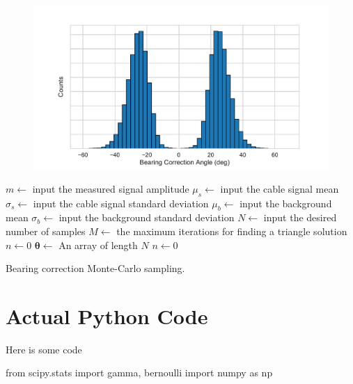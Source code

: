 \documentclass[paper=a4, fontsize=11pt]{scrartcl}
\numberwithin{equation}{section}		%
\numberwithin{figure}{section}			%
\numberwithin{table}{section}				%
\begin{document}
\begin{appendices}
\begin{figure}
  
  \label{fig:correction_hist}
  \centering
  \includegraphics[width=1.0\textwidth]{figures/correction_hist.pdf}
\end{figure}

\begin{algorithm}[H] \label{monte_algo}
\SetAlgoLined
{}
 $m \gets$ input the measured signal amplitude\;
 $\mu_s \gets$ input the cable signal mean\;
 $\sigma_s \gets$ input the cable signal standard deviation\;
 $\mu_b \gets$ input the background mean\;
 $\sigma_b \gets$ input the background standard deviation\;
 $N \gets$ input the desired number of samples\;
 $M \gets$ the maximum iterations for finding a triangle solution\;
 $n \gets 0$\;
 $\bm{\theta} \gets$ An array of length $N$\;
 $n \gets 0$\;
 \caption{Bearing correction Monte-Carlo sampling.}
\end{algorithm}

\section{Actual Python Code}
Here is some code
\pagebreak
\begin{python}
from scipy.stats import gamma, bernoulli
import numpy as np


\end{python}
\end{appendices}
\end{document}
